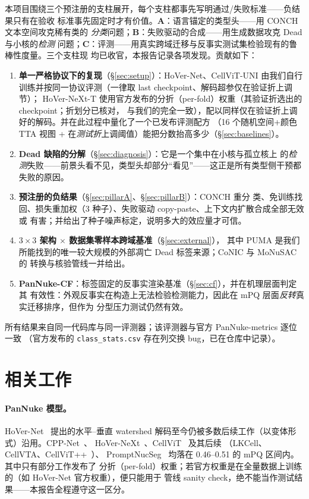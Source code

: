 \documentclass[11pt]{article}
\begin{document}
本项目围绕三个预注册的支柱展开，每个支柱都事先写明通过/失败标准——负结果只有在验收
标准事先固定时才有价值。\textbf{A}：语言锚定的类型头——用 CONCH 文本空间攻克稀有类的
\emph{分类}问题；\textbf{B}：失败驱动的合成——用生成数据攻克 Dead 与小核的\emph{检测}
问题；\textbf{C}：评测——用真实跨域迁移与反事实测试集检验现有的鲁棒性度量。三个支柱现
均已收官，本报告记录各项发现。贡献如下：

\begin{enumerate}
\item \textbf{单一严格协议下的复现}（\S\ref{sec:setup}）：HoVer-Net、CellViT-UNI
由我们自行训练并按同一协议评测（一律取 last checkpoint、解码超参仅在验证折上调节）；
HoVer-NeXt-T 使用官方发布的分折（per-fold）权重（其验证折选出的 checkpoint；折划分已核对，
与我们的完全一致），配以同样仅在验证折上调好的解码。并在此过程中量化了一个已发布评测配方
（16 个随机空间+颜色 TTA 视图 + 在\emph{测试折}上调阈值）能把分数抬高多少（\S\ref{sec:baselines}）。
\item \textbf{Dead 缺陷的分解}（\S\ref{sec:diagnosis}）：它是一个集中在小核与孤立核上
的\emph{检测}失败——前景头看不见，类型头却部分“看见”——这正是所有类型侧干预都失败的原因。
\item \textbf{预注册的负结果}（\S\ref{sec:pillarA}、\S\ref{sec:pillarB}）：CONCH 重分
类、免训练找回、损失重加权（3 种子）、失败驱动 copy-paste、上下文内扩散合成全部无效或
有害；并给出了种子噪声标定，说明多大的效应量才可信。
\item \textbf{$3{\times}3$ 架构 $\times$ 数据集零样本跨域基准}（\S\ref{sec:external}），
其中 PUMA 是我们所能找到的唯一较大规模的外部凋亡 Dead 标签来源；CoNIC 与 MoNuSAC 的
转换与核验管线一并给出。
\item \textbf{PanNuke-CF}：标签固定的反事实渲染基准（\S\ref{sec:cf}），并在机理层面判定其
有效性：外观反事实在构造上无法检验检测能力，因此在 mPQ 层面\emph{反转}真实迁移排序，但作为
分型压力测试仍然有效。
\end{enumerate}

所有结果来自同一代码库与同一评测器；该评测器与官方 PanNuke-metrics 逐位一致
（官方发布的 \texttt{class\_stats.csv} 存在列交换 bug，已在仓库中记录）。

\section{相关工作}
\label{sec:related}

\paragraph{PanNuke 模型。}HoVer-Net~\cite{graham2019hovernet} 提出的水平--垂直
watershed 解码至今仍被多数后续工作（以变体形式）沿用。CPP-Net~\cite{cppnet}、
HoVer-NeXt~\cite{hovenext}、CellViT~\cite{horta2024cellvit} 及其后续
（LKCell、CellVTA、CellViT++~\cite{horta2025cellvitpp}）、
PromptNucSeg~\cite{promptnucseg} 均落在 0.46--0.51 的 mPQ 区间内。其中只有部分工作发布了
分折（per-fold）权重；若官方权重是在全量数据上训练的（如 HoVer-Net 官方权重），便只能用于
管线 sanity check，绝不能当作测试结果——本报告全程遵守这一区分。
\end{document}

